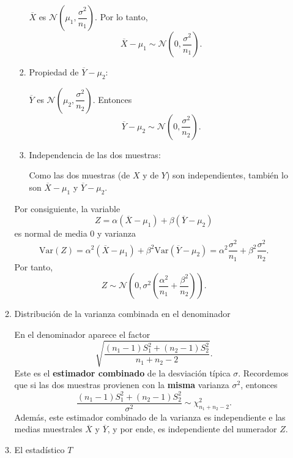 \begin{enumerate}[label=\color{red}\textbf{\arabic*)}]
\begin{enumerate}[label=\arabic*)]
\begin{enumerate}[label=\arabic*)]
                $\overline{X}$ es $\mathcal{N}\left( \mu_1,\dfrac{\sigma^2}{n_1} \right) $. Por lo tanto, \[
                \overline{X}-\mu_1\sim \mathcal{N}\left( 0,\dfrac{\sigma^2}{n_1} \right) .
                \] 
            \item Propiedad de $\overline{Y}-\mu_2$: 

                $\overline{Y}$ es $\mathcal{N}\left( \mu_2,\dfrac{\sigma^2}{n_2} \right) $. Entonces \[
                \overline{Y}-\mu_2\sim \mathcal{N}\left( 0,\dfrac{\sigma^2}{n_2} \right) .
                \] 
            \item Independencia de las dos muestras:

                Como las dos muestras (de $X$ y de  $Y$) son independientes, también lo son $\overline{X}-\mu_1$ y $\overline{Y}-\mu_2$.
        \end{enumerate}
        Por consiguiente, la variable \[
        Z=\alpha(\overline{X}-\mu_1)+\beta(\overline{Y}-\mu_2)
        \] es normal de media $0$ y varianza \[
        \mathrm{Var}(Z)=\alpha^2(\overline{X}-\mu_1)+\beta^2\mathrm{Var}(\overline{Y}-\mu_2)=\alpha^2\dfrac{\sigma^2}{n_1}+\beta^2 \dfrac{\sigma^2}{n_2}.
        \] 
        Por tanto, \[
        Z\sim \mathcal{N}\left( 0,\sigma^2\left( \dfrac{\alpha^2}{n_1}+\dfrac{\beta^2}{n_2} \right)  \right) .
        \] 
    \item Distribución de la varianza combinada en el denominador

        En el denominador aparece el factor \[
        \sqrt{\dfrac{(n_1-1)S_1^2+(n_2-1)S_2^2}{n_1+n_2-2}} .
        \] 
        Este es el \textbf{estimador combinado} de la desviación típica $\sigma$. Recordemos que si las dos muestras provienen con la \textbf{misma} varianza $\sigma^2$, entonces \[
        \dfrac{(n_1-1)S_1^2+(n_2-1)S_2^2}{\sigma^2}\sim \chi_{n_1+n_2-2}^2.
        \]   
        Además, este estimador combinado de la varianza es independiente e las medias muestrales $\overline{X}$ y $\overline{Y}$, y por ende, es independiente del numerador $Z$.
    \item El estadístico  $T$


\end{enumerate}
\end{enumerate}
